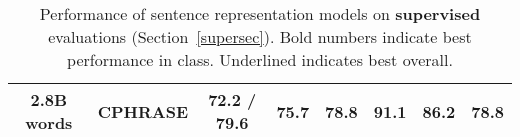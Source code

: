 \begin{table*}[ht]
\begin{center}
{\begin{tabular}{c|l|cccccc}
          2.8B words &CPHRASE & 72.2	 / 79.6	& 75.7	& 78.8	& 91.1	&  86.2	& 78.8 \\
           
          \hline 
        \end{tabular}

    }
    \caption{\label{supervised} Performance of sentence representation models on {\bf supervised} evaluations  (Section~\ref{supersec}). Bold numbers indicate best performance in class. Underlined indicates best overall. }
  \end{center}
  \vspace*{-4ex}
\end{table*}

\begin{table*}[ht]
\small
\newcommand{\mc}[1]{\multicolumn{1}{l|}{#1}}
  \begin{center}


\end{center}
\end{table*}
